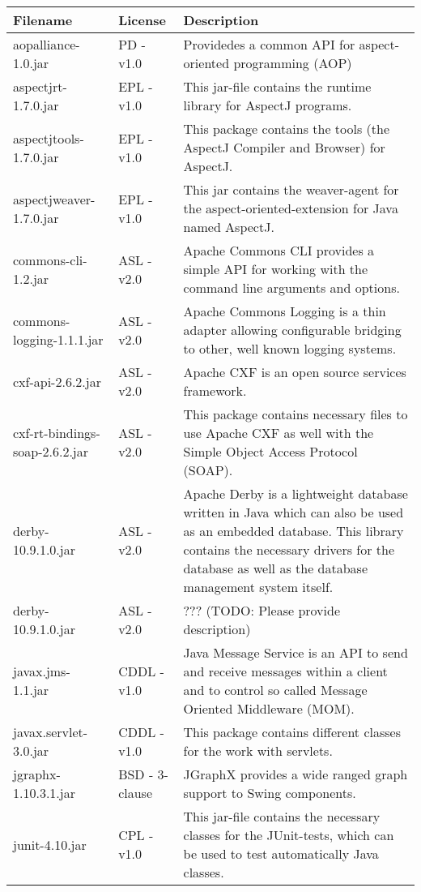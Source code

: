 \begin{center}
\begin{longtable}{|p{}|p{}|p{}|}
\hline 
Filename & License & Description\\
\hline
\hline 
aopalliance-1.0.jar & PD - v1.0 & Providedes a common API for aspect-oriented programming (AOP)\\
\hline 
aspectjrt-1.7.0.jar & EPL - v1.0 & This jar-file contains the runtime library for AspectJ programs.\\
\hline 
aspectjtools-1.7.0.jar & EPL - v1.0 & This package contains the tools (the AspectJ Compiler and Browser) for AspectJ.\\
\hline 
aspectjweaver-1.7.0.jar & EPL - v1.0 & This jar contains the weaver-agent for the aspect-oriented-extension for Java named AspectJ.\\
\hline 
commons-cli-1.2.jar & ASL - v2.0 & Apache Commons CLI provides a simple API for working with the command line arguments and options.\\
\hline 
commons-logging-1.1.1.jar & ASL - v2.0 & Apache Commons Logging is a thin adapter allowing configurable bridging to other, well known logging systems.\\
\hline 
cxf-api-2.6.2.jar & ASL - v2.0 & Apache CXF is an open source services framework.\\
\hline 
cxf-rt-bindings-soap-2.6.2.jar & ASL - v2.0 & This package contains necessary files to use Apache CXF as well with the Simple Object Access Protocol (SOAP).\\
\hline 
derby-10.9.1.0.jar & ASL - v2.0 & Apache Derby is a lightweight database written in Java which can also be used as an embedded database. This library contains the necessary drivers for the database as well as the database management system itself.\\
\hline 
derby-10.9.1.0.jar & ASL - v2.0 & ??? (TODO: Please provide description)\\
\hline 
javax.jms-1.1.jar & CDDL - v1.0 & Java Message Service is an API to send and receive messages within a client and to control so called Message Oriented Middleware (MOM).\\
\hline 
javax.servlet-3.0.jar & CDDL - v1.0 & This package contains different classes for the work with servlets.\\
\hline 
jgraphx-1.10.3.1.jar & BSD - 3-clause & JGraphX provides a wide ranged graph support to Swing components.\\
\hline 
junit-4.10.jar & CPL - v1.0 & This jar-file contains the necessary classes for the JUnit-tests, which can be used to test automatically Java classes.\\

\end{longtable}
\end{center}
